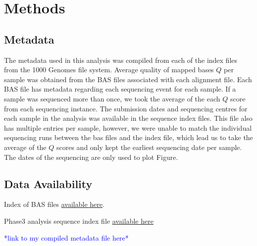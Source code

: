 \documentclass[9pt,lineno]{elife}
\newcommand{\todo}[1]{\textcolor{blue}{*#1*}}
\begin{document}
\section{Methods}
\subsection{Metadata}
The metadata used in this analysis was compiled from each of the index files from the 1000 Genomes file system. 
Average quality of mapped bases $Q$ per sample was obtained from the BAS files associated with each alignment file. 
Each BAS file has metadata regarding each sequencing event for each sample. 
If a sample was sequenced more than once, we took the average of the each $Q$ score from each sequencing instance. 
The submission dates and sequencing centres for each sample in the analysis was available in the sequence index files.  
This file also has multiple entries per sample, however, we were unable to match the individual sequencing runs between the bas files and the index file, which lead us to take the average of the $Q$ scores and only kept the earliest sequencing date per sample. 
The dates of the sequencing are only used to plot Figure.

\subsection{Data Availability}

Index of BAS files \href{http://ftp.1000genomes.ebi.ac.uk/vol1/ftp/data_collections/1000_genomes_project/1000genomes.low_coverage.GRCh38DH.alignment.index}{available here}.

Phase3 analysis sequence index file  \href{http://ftp.1000genomes.ebi.ac.uk/vol1/ftp/phase3/20130502.phase3.analysis.sequence.index}{available here} 

\todo{link to my compiled metadata file here}
\end{document}
